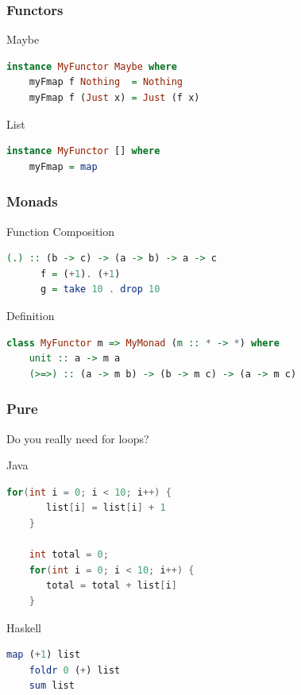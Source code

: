 \documentclass{beamer}
\begin{document}
\begin{frame}[fragile]
  \frametitle{Functors}

\begin{block}{Maybe}
  \begin{lstlisting}[language=Haskell]
    instance MyFunctor Maybe where
    myFmap f Nothing  = Nothing
    myFmap f (Just x) = Just (f x)
  \end{lstlisting}
\end{block}

\begin{block}{List}
  \begin{lstlisting}[language=Haskell]
    instance MyFunctor [] where
    myFmap = map
  \end{lstlisting}
\end{block}

\end{frame}

\begin{frame}[fragile]
  \frametitle{Monads}

  \begin{block}{Function Composition}
    \begin{lstlisting}[language=Haskell]
      (.) :: (b -> c) -> (a -> b) -> a -> c
      f = (+1). (+1)
      g = take 10 . drop 10
    \end{lstlisting}
  \end{block}

\begin{block}{Definition}
  \begin{lstlisting}[language=Haskell]
    class MyFunctor m => MyMonad (m :: * -> *) where
    unit :: a -> m a
    (>=>) :: (a -> m b) -> (b -> m c) -> (a -> m c)
  \end{lstlisting}
\end{block}

\end{frame}


\begin{frame}[fragile]
\frametitle{Pure}
Do you really need for loops?

 \begin{block}{Java}
  \begin{lstlisting}[language=Java]
    for(int i = 0; i < 10; i++) {
       list[i] = list[i] + 1
    }

    int total = 0;
    for(int i = 0; i < 10; i++) {
       total = total + list[i]
    }

  \end{lstlisting}
 \end{block}

 \begin{block}{Haskell}
  \begin{lstlisting}[language=Haskell]
    map (+1) list
    foldr 0 (+) list
    sum list
  \end{lstlisting}
 \end{block}

\end{frame}
\end{document}
